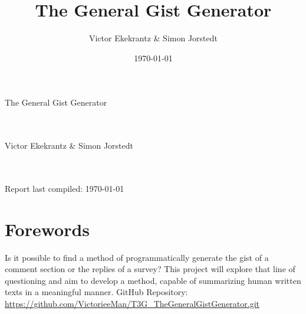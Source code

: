 \documentclass[12pt,a4paper]{article}
\title{The General Gist Generator}
\author{Victor Ekekrantz & Simon Jorstedt}
\date{\today}
\begin{document}
\thispagestyle{empty}
\begin{Huge}
The General Gist Generator
\end{Huge}
\begin{huge}
\\\\Victor Ekekrantz \& Simon Jorstedt
\end{huge}
\begin{LARGE}
\\\\Report last compiled: \today
\end{LARGE}

\section*{Forewords}
Is it possible to find a method of programmatically generate the gist of a comment section or the replies of a survey? This project will explore that line of questioning and aim to develop a method, capable of summarizing human written texts in a meaningful manner.
GitHub Repository: \url{https://github.com/VictorieeMan/T3G_TheGeneralGistGenerator.git}
\newpage
\tableofcontents
\end{document}
